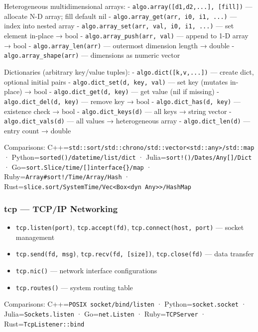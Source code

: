 \documentclass[
]{article}
\providecommand{\tightlist}{%
  \setlength{\itemsep}{0pt}\setlength{\parskip}{0pt}}
\begin{document}
Heterogeneous multidimensional arrays: -
\texttt{algo.array({[}d1,d2,...{]},\ {[}fill{]})} --- allocate N-D
array; fill default nil - \texttt{algo.array\_get(arr,\ i0,\ i1,\ ...)}
--- index into nested array -
\texttt{algo.array\_set(arr,\ val,\ i0,\ i1,\ ...)} --- set element
in-place → bool - \texttt{algo.array\_push(arr,\ val)} --- append to 1-D
array → bool - \texttt{algo.array\_len(arr)} --- outermost dimension
length → double - \texttt{algo.array\_shape(arr)} --- dimensions as
numeric vector

Dictionaries (arbitrary key/value tuples): -
\texttt{algo.dict({[}k,v,...{]})} --- create dict, optional initial
pairs - \texttt{algo.dict\_set(d,\ key,\ val)} --- set key (mutates
in-place) → bool - \texttt{algo.dict\_get(d,\ key)} --- get value (nil
if missing) - \texttt{algo.dict\_del(d,\ key)} --- remove key → bool -
\texttt{algo.dict\_has(d,\ key)} --- existence check → bool -
\texttt{algo.dict\_keys(d)} --- all keys → string vector -
\texttt{algo.dict\_vals(d)} --- all values → heterogeneous array -
\texttt{algo.dict\_len(d)} --- entry count → double

Comparisons:
C++=\texttt{std::sort/std::chrono/std::vector\textless{}std::any\textgreater{}/std::map}
· Python=\texttt{sorted()/datetime/list/dict} ·
Julia=\texttt{sort!()/Dates/Any{[}{]}/Dict} ·
Go=\texttt{sort.Slice/time/{[}{]}interface\{\}/map} ·
Ruby=\texttt{Array\#sort!/Time/Array/Hash} ·
Rust=\texttt{slice.sort/SystemTime/Vec\textless{}Box\textless{}dyn\ Any\textgreater{}\textgreater{}/HashMap}

\subsubsection{tcp --- TCP/IP Networking}\label{tcp-tcpip-networking}

\begin{itemize}
\tightlist
\item
  \texttt{tcp.listen(port)}, \texttt{tcp.accept(fd)},
  \texttt{tcp.connect(host,\ port)} --- socket management
\item
  \texttt{tcp.send(fd,\ msg)}, \texttt{tcp.recv(fd,\ {[}size{]})},
  \texttt{tcp.close(fd)} --- data transfer
\item
  \texttt{tcp.nic()} --- network interface configurations
\item
  \texttt{tcp.routes()} --- system routing table
\end{itemize}

Comparisons: C++=\texttt{POSIX\ socket/bind/listen} ·
Python=\texttt{socket.socket} · Julia=\texttt{Sockets.listen} ·
Go=\texttt{net.Listen} · Ruby=\texttt{TCPServer} ·
Rust=\texttt{TcpListener::bind}
\end{document}
